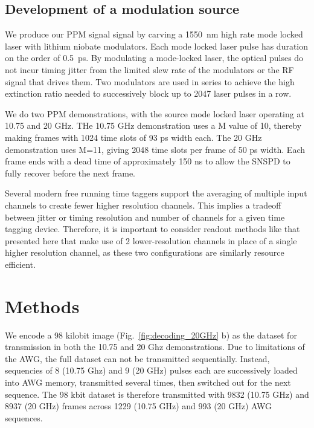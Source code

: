 \documentclass[11pt]{caltech_thesis} %
\begin{document}
\hypertarget{development-of-a-modulation-source}{%
\subsection{Development of a modulation source}\label{development-of-a-modulation-source}}

We produce our PPM signal signal by carving a 1550~nm high rate mode locked laser with lithium niobate modulators. Each mode locked laser pulse has duration on the order of 0.5~ps. By modulating a mode-locked laser,
the optical pulses do not incur timing jitter from the limited slew rate of the modulators or the RF signal that drives them. Two modulators are used in series to achieve the high extinction ratio needed to successively block up to 2047 laser pulses in a row.

We do two PPM demonstrations, with the source mode locked laser operating at 10.75 and 20 GHz. THe 10.75 GHz demonstration uses a M value of 10, thereby making frames with 1024 time slots of 93 ps width each. The 20 GHz demonstration uses M=11, giving 2048 time slots per frame of 50 ps width. Each frame ends with a dead time of approximately 150 ns to allow the SNSPD to fully recover before the next frame.

Several modern free running time taggers support the averaging of multiple input channels to create fewer higher resolution channels. This implies a tradeoff between jitter or timing resolution and number of channels for a given time tagging device. Therefore, it is important to consider readout methods like that presented here that make use of 2 lower-resolution channels in place of a single higher resolution channel, as these two configurations are similarly resource efficient.

\hypertarget{methods}{%
\section{Methods}\label{methods}}

We encode a 98 kilobit image (Fig.~\ref{fig:decoding_20GHz} b) as the dataset for transmission in both the 10.75 and 20 Ghz demonstrations. Due to limitations of the AWG, the full dataset can not be transmitted sequentially. Instead, sequencies of 8 (10.75 Ghz) and 9 (20 GHz) pulses each are successively loaded into AWG memory, transmitted several times, then switched out for the next sequence. The 98 kbit dataset is therefore transmitted with 9832 (10.75 GHz) and 8937 (20 GHz) frames across 1229 (10.75 GHz) and 993 (20 GHz) AWG sequences.
\end{document}
